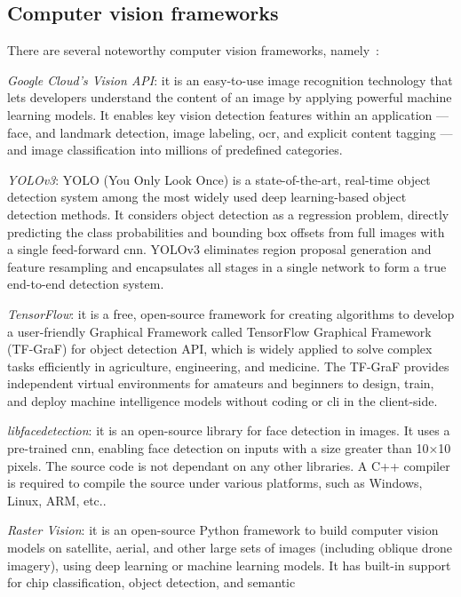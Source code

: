 \subsection{Computer vision frameworks}
\label{sec:comp-visi-fram}
There are several noteworthy computer vision frameworks, namely~\cite{cv-frameworks-2020}:
\begin{enum-c}
\item \emph{Google Cloud's Vision API}:
it is an easy-to-use image recognition technology that
lets developers understand the content of an image by applying powerful machine
learning models. It enables key vision
detection features within an application ---  face, and landmark
detection, image labeling, \gls{ocr}, and explicit
content tagging --- and image classification into millions of predefined
categories.
\item \emph{YOLOv3}:
YOLO (You Only Look Once) is a state-of-the-art, real-time object detection
system among the most widely used deep learning-based object detection methods. It considers object detection as a regression problem,
directly predicting the class probabilities and bounding box offsets from full
images with a single feed-forward \gls{cnn}.
YOLOv3 eliminates region proposal generation and feature
resampling and encapsulates all stages in a single network to form a true
end-to-end detection system.
\item \emph{TensorFlow}:
it is a free, open-source framework for creating algorithms to develop a
user-friendly Graphical Framework called TensorFlow Graphical Framework
(TF-GraF) for object detection API, which is widely applied to solve complex
tasks efficiently in agriculture, engineering, and medicine.
The TF-GraF provides independent virtual environments for amateurs and beginners
to design, train, and deploy machine intelligence models without coding or
\gls{cli} in the client-side.
\item \emph{libfacedetection}:
it is an open-source library for face detection in images. It uses a pre-trained
\gls{cnn}, enabling face detection on inputs with a size greater than 10×10
pixels. The source code is not dependant on any other libraries. A C++ compiler
is required to compile the source under various platforms, such as Windows,
Linux, ARM, etc..
\item \emph{Raster Vision}:
it is an open-source Python framework to build computer vision models on
satellite, aerial, and other large sets of images (including oblique drone
imagery), using deep learning or machine learning models.
It has built-in support for chip classification, object detection, and semantic

\end{enum-c}
